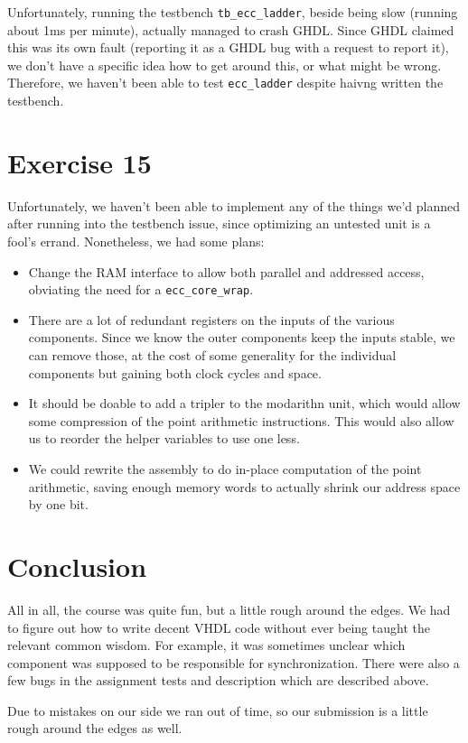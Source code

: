 \documentclass[a4paper,twoside]{article}
\newcommand{\atom}[1]{\mbox{\texttt{#1}}}
\begin{document}
Unfortunately, running the testbench \atom{tb\_ecc\_ladder}, beside being slow
(running about 1ms per minute), actually managed to crash GHDL. Since GHDL
claimed this was its own fault (reporting it as a GHDL bug with a request to
report it), we don't have a specific idea how to get around this, or what might
be wrong. Therefore, we haven't been able to test \atom{ecc\_ladder} despite
haivng written the testbench.

\section*{Exercise 15}
Unfortunately, we haven't been able to implement any of the things we'd planned
after running into the testbench issue, since optimizing an untested unit is a
fool's errand. Nonetheless, we had some plans:
\begin{itemize}
    \item Change the RAM interface to allow both parallel and addressed access,
        obviating the need for a \atom{ecc\_core\_wrap}.
    \item There are a lot of redundant registers on the inputs of the various
        components. Since we know the outer components keep the inputs stable,
        we can remove those, at the cost of some generality for the individual
        components but gaining both clock cycles and space.
    \item It should be doable to add a tripler to the modarithn unit, which
        would allow some compression of the point arithmetic instructions. This
        would also allow us to reorder the helper variables to use one less.
    \item We could rewrite the assembly to do in-place computation of the point
        arithmetic, saving enough memory words to actually shrink our address
        space by one bit.
\end{itemize}

\section*{Conclusion}

All in all, the course was quite fun, but a little rough around the edges. We
had to figure out how to write decent VHDL code without ever being taught the
relevant common wisdom. For example, it was sometimes unclear which component
was supposed to be responsible for synchronization. There were also a few bugs
in the assignment tests and description which are described above.

Due to mistakes on our side we ran out of time, so our submission is a little
rough around the edges as well.
\end{document}
